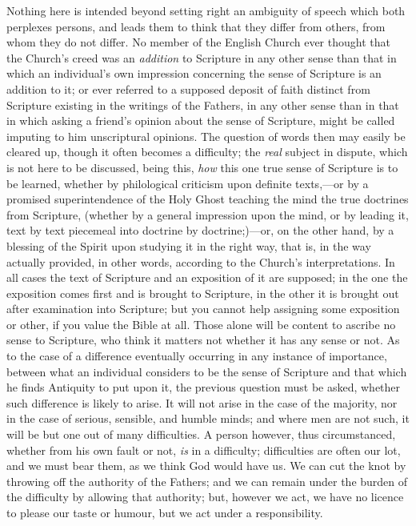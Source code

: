 Nothing here is intended
beyond setting right an ambiguity of speech which both perplexes
persons, and leads them to think that they differ from others, from
whom they do not differ. No member of the English Church ever thought
that the Church's creed was an \emph{addition} to Scripture in any
other sense than that in which an individual's own impression
concerning the sense of Scripture is an addition to it; or ever
referred to a supposed deposit of faith distinct from Scripture
existing in the writings of the Fathers, in any other sense than in
that in which asking a friend's opinion about the sense of Scripture,
might be called imputing to him unscriptural opinions. The question of
words then may easily be cleared up, though it often becomes a
difficulty; the \emph{real} subject in dispute, which is not here to
be discussed, being this, \emph{how} this one true sense of Scripture
is to be learned, whether by philological criticism upon definite
texts,—or by a promised superintendence of the Holy Ghost teaching
the mind the true doctrines from Scripture, (whether by a general
impression upon the mind, or by leading it, text by text piecemeal
into doctrine by doctrine;)—or, on the other hand, by a blessing of
the Spirit upon studying it in the right way, that is, in the way
actually provided, in other words, according to the Church's
interpretations. In all cases the text of Scripture and an exposition
of it are supposed; in the one the exposition comes first and is
brought to Scripture, in the other it is brought out after examination
into Scripture; but you cannot help assigning some exposition or
other, if you value the Bible at all. Those alone will be content to
ascribe no sense to Scripture, who think it matters not whether it has
any sense or not. As to the case of a difference eventually occurring
in any instance of importance, between what an individual considers to
be the sense of Scripture and that which he finds Antiquity to put
upon it, the previous question must be asked, whether such difference
is likely to arise. It will not arise in the case of the majority, nor
in the case of serious, sensible, and humble minds; and where
men are not such, it will be but one out of many difficulties. A
person however, thus circumstanced, whether from his own fault or not,
\emph{is} in a difficulty; difficulties are often our lot, and we must
bear them, as we think God would have us. We can cut the knot by
throwing off the authority of the Fathers; and we can remain under the
burden of the difficulty by allowing that authority; but, however we
act, we have no licence to please our taste or humour, but we act
under a responsibility.

